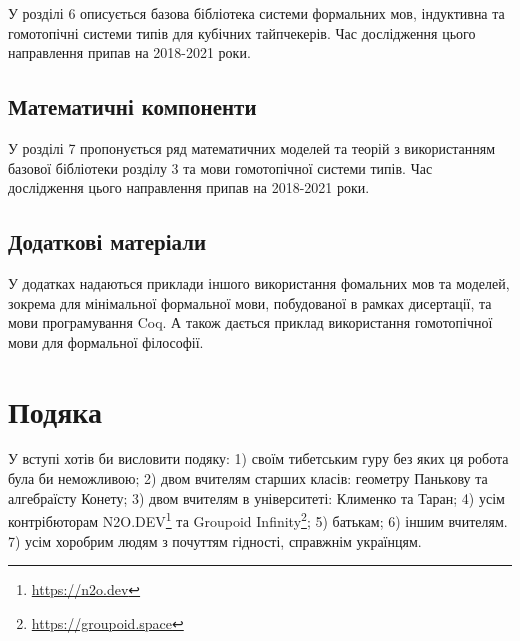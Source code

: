 У розділі 6 описується базова бібліотека системи формальних мов, індуктивна
та гомотопічні системи типів для кубічних тайпчекерів.
Час дослідження цього направлення припав на 2018-2021 роки.

\newpage
\subsection*{Математичні компоненти}
У розділі 7 пропонується ряд математичних моделей та теорій з використанням
базової бібліотеки розділу 3 та мови гомотопічної системи типів.
Час дослідження цього направлення припав на 2018-2021 роки.

\subsection*{Додаткові матеріали}
У додатках надаються приклади іншого використання фомальних мов та моделей,
зокрема для мінімальної формальної мови, побудованої в рамках дисертації,
та мови програмування Coq. А також дається приклад використання
гомотопічної мови для формальної філософії.

\section{Подяка}
У вступі хотів би висловити подяку:
1) своїм тибетським гуру без яких ця робота була би неможливою;
2) двом вчителям старших класів: геометру Панькову та алгебраїсту Конету;
3) двом вчителям в університеті: Клименко та Таран;
4) усім контрібюторам N2O.DEV\footnote{\url{https://n2o.dev}} та Groupoid Infinity\footnote{\url{https://groupoid.space}};
5) батькам;
6) іншим вчителям.
7) усім хоробрим людям з почуттям гідності, справжнім українцям.
